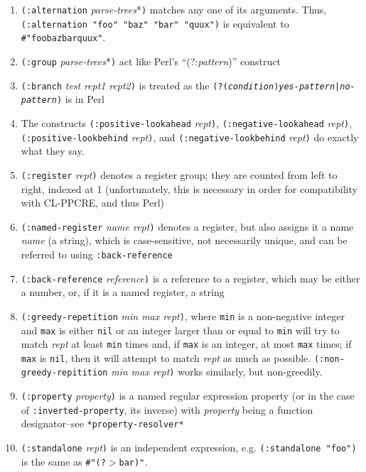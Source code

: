 \documentclass[10pt]{book}
\begin{document}
\begin{enumerate}
\item \texttt{(:alternation} \textit{parse-trees}*\texttt{)} matches any one of its arguments. Thus, \texttt{(:alternation "foo" "baz" "bar" "quux")} is equivalent to \texttt{\#"foo\textbar{}baz\textbar{}bar\textbar{}quux"}.
\item \texttt{(:group} \textit{parse-trees}*\texttt{)} act like Perl's ``(?:\textit{pattern})'' construct
\item \texttt{(:branch} \textit{test} \textit{rept1} \textit{rept2}\texttt{)} is treated as the \texttt{(?(\textit{condition})\textit{yes-pattern}|\textit{no-pattern})} is in Perl
\item The constructs \texttt{(:positive-lookahead} \textit{rept}\texttt{)}, \texttt{(:negative-lookahead} \textit{rept}\texttt{)}, \texttt{(:positive-lookbehind} \textit{rept}\texttt{)}, and \texttt{(:negative-lookbehind} \textit{rept}\texttt{)} do exactly what they say.
\item \texttt{(:register} \textit{rept}\texttt{)} denotes a register group; they are counted from left to right, indexed at 1 (unfortunately, this is necessary in order for compatibility with CL-PPCRE, and thus Perl)
\item \texttt{(:named-register} \textit{name rept}\texttt{)} denotes a register, but also assigns it a name \textit{name} (a string), which is case-sensitive, not necessarily unique, and can be referred to using \texttt{:back-reference}
\item \texttt{(:back-reference} \textit{reference}\texttt{)} is a reference to a register, which may be either a number, or, if it is a named register, a string
\item \texttt{(:greedy-repetition} \textit{min max rept}\texttt{)}, where \texttt{min} is a non-negative integer and \texttt{max} is either \texttt{nil} or an integer larger than or equal to \texttt{min} will try to match \textit{rept} at least \texttt{min} times and, if \texttt{max} is an integer, at most \texttt{max} times; if \texttt{max} is \texttt{nil}, then it will attempt to match \textit{rept} as much as possible. \texttt{(:non-greedy-repitition} \textit{min max rept}\texttt{)} works similarly, but non-greedily.
\item \texttt{(:property} \textit{property}\texttt{)} is a named regular expression property (or in the case of \texttt{:inverted-property}, its inverse) with \textit{property} being a function designator--see \texttt{*property-resolver*}
\item \texttt{(:standalone} \textit{rept}\texttt{)} is an independent expression, e.g. \texttt{(:standalone "foo")} is the same as \texttt{\#"(?}$>$\texttt{bar)"}.

\end{enumerate}
\end{document}
